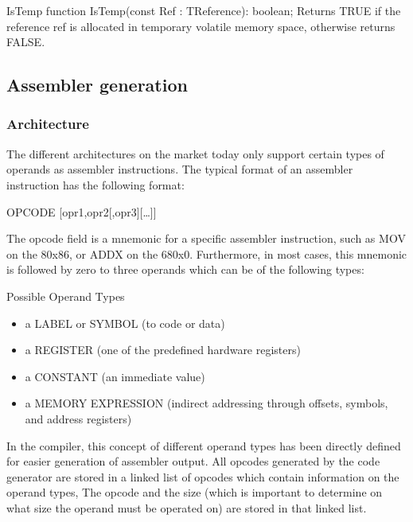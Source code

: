 \documentclass [a4paper,12pt]{article}
\begin{document}
\begin{function}{IsTemp}
\Declaration
function IsTemp(const Ref : TReference): boolean;
\Description
Returns TRUE if the reference \textsf{ref }is allocated in temporary
volatile memory space, otherwise returns FALSE.
\end{function}

\subsection{Assembler generation}
\label{subsec:mylabel8}

\subsubsection{Architecture}
\label{subsubsec:architectureneration}

The different architectures on the market today only support certain types
of operands as assembler instructions. The typical format of an assembler
instruction has the following format:

\begin{center}
\textsf{OPCODE [opr1,opr2[,opr3][\ldots ]]}
\end{center}

The opcode field is a mnemonic for a specific assembler instruction, such as
\textsf{MOV} on the 80x86, or \textsf{ADDX} on the 680x0. Furthermore, in
most cases, this mnemonic is followed by zero to three operands which can be
of the following types:

Possible Operand Types
\begin{itemize}
\item a LABEL or SYMBOL (to code or data)
\item a REGISTER (one of the predefined hardware registers) 
\item a CONSTANT (an immediate value)
\item a MEMORY EXPRESSION (indirect addressing through offsets, symbols, and
     address registers)
\end{itemize}

In the compiler, this concept of different operand types has been directly
defined for easier generation of assembler output. All opcodes generated by
the code generator are stored in a linked list of opcodes which contain
information on the operand types, The opcode and the size (which is
important to determine on what size the operand must be operated on) are
stored in that linked list.
\end{document}
